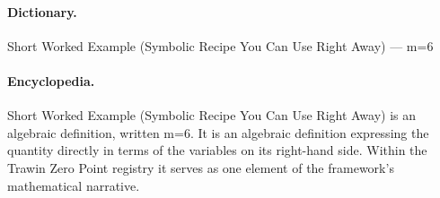 \paragraph{Dictionary.}
Short Worked Example (Symbolic Recipe You Can Use Right Away) — m=6

\paragraph{Encyclopedia.}
Short Worked Example (Symbolic Recipe You Can Use Right Away) is an algebraic definition, written m=6. It is an algebraic definition expressing the quantity directly in terms of the variables on its right-hand side. Within the Trawin Zero Point registry it serves as one element of the framework's mathematical narrative.
